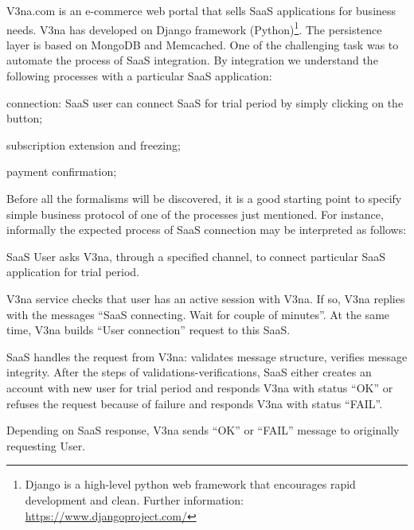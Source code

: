 V3na.com is an e-commerce web portal that sells SaaS applications for business needs. V3na has developed on Django framework (Python)\footnote{ Django is a high-level python web framework that encourages rapid development and clean. Further information: \url{https://www.djangoproject.com/}}. The persistence layer is based on MongoDB and Memcached. One of the challenging task was to automate the process of SaaS integration. By integration we understand the following processes with a particular SaaS application:

\begin{compactenum}
\item  connection: SaaS user can connect SaaS for trial period by simply clicking on the button;

\item  subscription extension and freezing;

\item  payment confirmation;
\end{compactenum}

Before all the formalisms will be discovered, it is a good starting point to specify simple business protocol of one of the processes just mentioned. For instance, informally the expected process of SaaS connection may be interpreted as follows:

\begin{compactenum}
\item  SaaS User asks V3na, through a specified channel, to connect particular SaaS application for trial period.

\item  V3na service checks that user has an active session with V3na. If so, V3na replies with the messages ``SaaS connecting. Wait for couple of minutes''. At the same time, V3na builds ``User connection'' request to this SaaS.

\item  SaaS handles the request from V3na: validates message structure, verifies message integrity. After the steps of validations-verifications, SaaS either creates an account with new user for trial period and responds V3na with status ``OK'' or refuses the request because of failure and responds V3na with status ``FAIL''.

\item  Depending on SaaS response, V3na sends ``OK'' or ``FAIL'' message to originally requesting User.
\end{compactenum}

